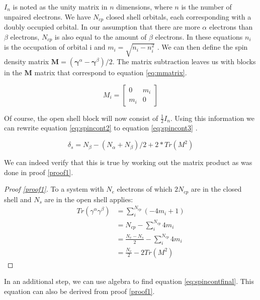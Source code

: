 $I_n$ is noted as the unity matrix in $n$ dimensions, where $n$ is the number of unpaired electrons. We have $N_{cp}$ closed shell orbitals, each corresponding with a doubly occupied
orbital. In our assumption that there are more $\alpha$ electrons than $\beta$ electrons, $N_{cp}$ is also equal to the amount of $\beta$ electrons.
In these equations $n_i$ is the occupation of orbital i and $m_i = \sqrt{n_i - n_i^2}$ \cite{Scuseria2010}. We can then define the spin density matrix
$\mathbf{M} = (\mathbf{\gamma}^\alpha - \mathbf{\gamma}^\beta)/2$. The matrix subtraction leaves us with blocks in the $\mathbf{M}$ matrix that correspond to equation \eqref{eq:mmatrix}.

\begin{equation}\label{eq:mmatrix}
  M_i = \begin{bmatrix}
    0   & m_i \\
    m_i & 0
  \end{bmatrix}
\end{equation}

Of course, the open shell block will now consist of $\frac{1}{2}I_n$. Using this information we can rewrite equation \eqref{eq:spincont2} to equation
\eqref{eq:spincont3} \cite{Scuseria2010}.

\begin{equation}\label{eq:spincont3}
  \delta_s = N_\beta - (N_\alpha + N_\beta)/2 + 2*Tr(M^2)
\end{equation}

We can indeed verify that this is true by working out the matrix product as was done in proof \ref{proof1}.

\begin{proof}[Proof \ref{proof1}]\label{proof1}
  To a system with $N_e$ electrons of which $2N_{cp}$ are in the closed shell and $N_s$ are in the open shell applies:
  \begin{align*}
    Tr(\gamma^\alpha\gamma^\beta) & = \sum^{N_{cp}}_i (-4m_i + 1)               \\
                                  & = N_{cp} - \sum^{N_{cp}}_i 4m_i             \\
                                  & = \frac{N_e - N_s}{2} -\sum^{N_{cp}}_i 4m_i \\
                                  & = \frac{N_e}{2} - 2Tr(M^2)
  \end{align*}
\end{proof}

In an additional step, we can use algebra to find equation \eqref{eq:spincontfinal}. This equation can also be derived from proof \ref{proof1}.

